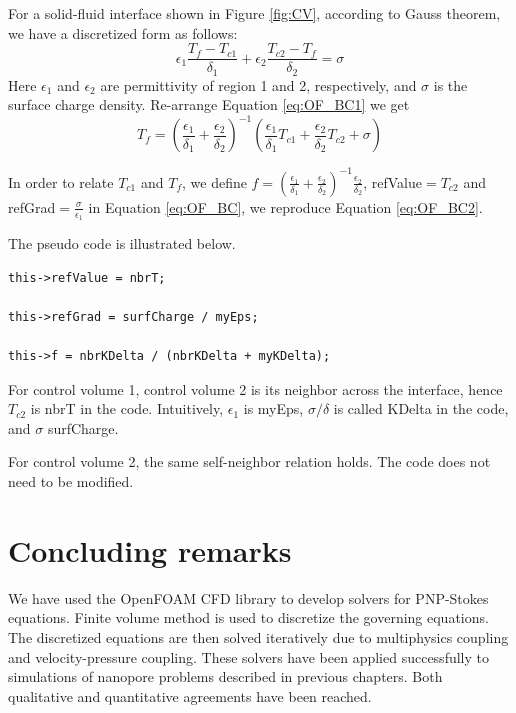 For a solid-fluid interface shown in Figure \ref{fig:CV}, according to Gauss theorem, we have a discretized form as follows:
\begin{equation}
\epsilon_1 \frac{T_f-T_{c1}}{\delta_1} + \epsilon_2 \frac{T_{c2}-T_f}{\delta_2} = \sigma
\label{eq:OF_BC1}
\end{equation}
Here $\epsilon_1$ and $\epsilon_2$ are permittivity of region 1 and 2, respectively, and $\sigma$ is the surface charge density. Re-arrange Equation \ref{eq:OF_BC1} we get
\begin{equation}
T_f = \left(\frac{\epsilon_1}{\delta_1}+\frac{\epsilon_2}{\delta_2}\right)^{-1} \left( \frac{\epsilon_1}{\delta_1}T_{c1}+\frac{\epsilon_2}{\delta_2}T_{c2}+\sigma\right)
\label{eq:OF_BC2}
\end{equation}

In order to relate $T_{c1}$ and $T_f$, we define $f = \left(\frac{\epsilon_1}{\delta_1}+\frac{\epsilon_2}{\delta_2}\right)^{-1}\frac{\epsilon_2}{\delta_2}$, \textsf{refValue}$=T_{c2}$ and \textsf{refGrad}$=\frac{\sigma}{\epsilon_1}$ in Equation \ref{eq:OF_BC}, we reproduce Equation \ref{eq:OF_BC2}. 

The pseudo code is illustrated below.

\begin{lstlisting}
this->refValue = nbrT;

this->refGrad = surfCharge / myEps;

this->f = nbrKDelta / (nbrKDelta + myKDelta);
\end{lstlisting}
For control volume 1, control volume 2 is its neighbor across the interface, hence $T_{c2}$ is \textsf{nbrT} in the code. Intuitively, $\epsilon_1$ is \textsf{myEps}, $\sigma/\delta$ is called \textsf{KDelta} in the code, and $\sigma$ \textsf{surfCharge}.

For control volume 2, the same self-neighbor relation holds. The code does not need to be modified.

\section{Concluding remarks}
We have used the OpenFOAM CFD library to develop solvers for PNP-Stokes equations. Finite volume method is used to discretize the governing equations. The discretized equations are then solved iteratively due to multiphysics coupling and velocity-pressure coupling. These solvers have been applied successfully to simulations of nanopore problems described in previous chapters. Both qualitative and quantitative agreements have been reached.

